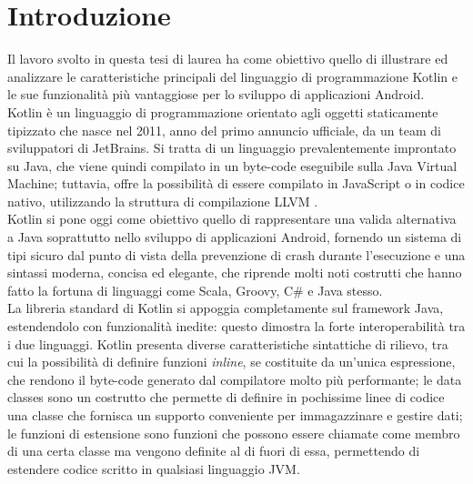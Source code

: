 
\chapter*{Introduzione}\label{ch:intro}

Il lavoro svolto in questa tesi di laurea ha come obiettivo quello di illustrare ed analizzare le caratteristiche principali del linguaggio di programmazione Kotlin e le sue funzionalità più vantaggiose per lo sviluppo di applicazioni Android.\\

Kotlin è un linguaggio di programmazione orientato agli oggetti staticamente tipizzato che nasce nel 2011, anno del primo annuncio ufficiale, da un team di sviluppatori di JetBrains. Si tratta di un linguaggio prevalentemente improntato su Java, che viene quindi compilato in un byte-code eseguibile sulla Java Virtual Machine; tuttavia, offre la possibilità di essere compilato in JavaScript o in codice nativo, utilizzando la struttura di compilazione LLVM \cite{LLVMWiki}.\\
Kotlin si pone oggi come obiettivo quello di rappresentare una valida alternativa a Java soprattutto nello sviluppo di applicazioni Android, fornendo un sistema di tipi sicuro dal punto di vista della prevenzione di crash durante l'esecuzione e una sintassi moderna, concisa ed elegante, che riprende molti noti costrutti che hanno fatto la fortuna di linguaggi come Scala, Groovy, C\# e Java stesso.\\
La libreria standard di Kotlin si appoggia completamente sul framework Java, estendendolo con funzionalità inedite: questo dimostra la forte interoperabilità tra i due linguaggi.
Kotlin presenta diverse caratteristiche sintattiche di rilievo, tra cui la possibilità di definire funzioni {\em inline}, se costituite da un'unica espressione, che rendono il byte-code generato dal compilatore molto più performante; le data classes sono un costrutto che permette di definire in pochissime linee di codice una classe che fornisca un supporto conveniente per immagazzinare e gestire dati; le funzioni di estensione sono funzioni che possono essere chiamate come membro di una certa classe ma vengono definite al di fuori di essa, permettendo di estendere codice scritto in qualsiasi linguaggio JVM.\\

